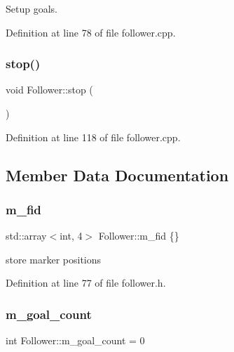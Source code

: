 Setup goals. 



Definition at line 78 of file follower.\+cpp.

\mbox{\label{class_follower_a84c17a75630c27bea4f401c8ab8e45b2}} 
\subsubsection{\texorpdfstring{stop()}{stop()}}
{\footnotesize\ttfamily void Follower\+::stop (\begin{DoxyParamCaption}{ }\end{DoxyParamCaption})}



Definition at line 118 of file follower.\+cpp.



\subsection{Member Data Documentation}
\mbox{\label{class_follower_a350054bbd7659d493cccc4b4ad9bc460}} 
\subsubsection{\texorpdfstring{m\+\_\+fid}{m\_fid}}
{\footnotesize\ttfamily std\+::array$<$int, 4$>$ Follower\+::m\+\_\+fid \{\}}



store marker positions 



Definition at line 77 of file follower.\+h.

\mbox{\label{class_follower_af53c7dcd8b5a99111bdfe0c8dd2015cf}} 
\subsubsection{\texorpdfstring{m\+\_\+goal\+\_\+count}{m\_goal\_count}}
{\footnotesize\ttfamily int Follower\+::m\+\_\+goal\+\_\+count = 0}



